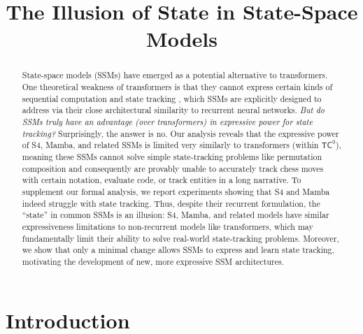 \title{The Illusion of State in State-Space Models}

\begin{abstract}
State-space models (SSMs) have emerged as a potential alternative to transformers. One theoretical weakness of transformers is that they cannot express certain kinds of sequential computation and state tracking \citep{merrill-sabharwal-2023-parallelism}, which SSMs are explicitly designed to address via their close architectural similarity to recurrent neural networks. \emph{But do SSMs truly have an advantage (over transformers) in expressive power for state tracking?} Surprisingly, the answer is no. Our analysis reveals that the expressive power of S4, Mamba, and related SSMs is limited very similarly to transformers (within $\mathsf{TC}^0$), meaning these SSMs cannot solve simple state-tracking problems like permutation composition and consequently are provably unable to accurately track chess moves with certain notation, evaluate code, or track entities in a long narrative. To supplement our formal analysis, we report experiments showing that S4 and Mamba indeed struggle with state tracking. Thus, despite their recurrent formulation, the ``state'' in common SSMs is an illusion: S4, Mamba, and related models have similar expressiveness limitations to non-recurrent models like transformers, which may fundamentally limit their ability to solve real-world state-tracking problems. Moreover, we show that only a minimal change allows SSMs to express and learn state tracking, motivating the development of new, more expressive SSM architectures.
\end{abstract}

\section{Introduction}

